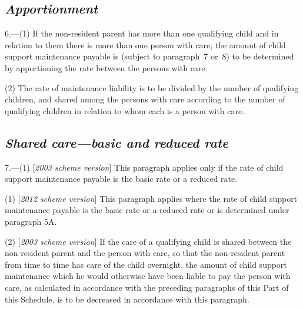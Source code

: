 \documentclass[12pt,a4paper]{article}
\begin{document}

\subsection*{\itshape Apportionment}

6.---(1) If the non-resident parent has more than one qualifying child and in relation to them there is more than one person with care, the amount of child support maintenance payable is (subject to paragraph~7 or~8) to be determined by apportioning the rate between the persons with care.

(2) The rate of maintenance liability is to be divided by the number of qualifying children, and shared among the persons with care according to the number of qualifying children in relation to whom each is a person with care.

\subsection*{\itshape Shared care—basic and reduced rate}

7.---(1) [\emph{2003 scheme version}] This paragraph applies only if the rate of child support maintenance payable is the basic rate or a reduced rate.

(1) [\emph{2012 scheme version}] This paragraph applies where the rate of child support maintenance payable is the basic rate or a reduced rate or is determined under paragraph 5A.

(2) [\emph{2003 scheme version}] If the care of a qualifying child is shared between the non-resident parent and the person with care, so that the non-resident parent from time to time has care of the child overnight, the amount of child support maintenance which he would otherwise have been liable to pay the person with care, as calculated in accordance with the preceding paragraphs of this Part of this Schedule, is to be decreased in accordance with this paragraph.
\end{document}
